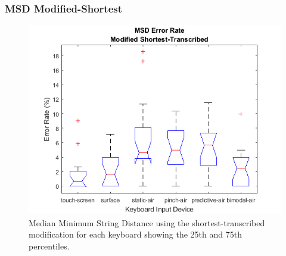 \subsubsection{MSD Modified-Shortest}
\begin{figure}[h]
	\centering
	\includegraphics{fig_MSD_short_boxplot}
	\caption[Minimum String Distance Boxplot for Modified-Shortest]{Median Minimum String Distance using the shortest-transcribed modification for each keyboard showing the 25th and 75th percentiles.}
	\label{fig_MSD_short_boxplot}
\end{figure}

